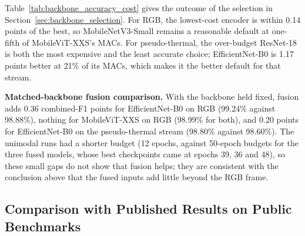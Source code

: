\begin{table}[H]
\centering
\caption[Accuracy vs.\ cost of visual backbones]{Combined F1 (\%) vs.\ cost of the visual backbones (cost from Table~\ref{tab:backbone_candidates}). Fused: AdapFuse-v1 with that backbone. $^\dagger$Lower bound. -- = not trained.}
\label{tab:backbone_accuracy_cost}
\end{table}

Table~\ref{tab:backbone_accuracy_cost} gives the outcome of the selection in Section~\ref{sec:backbone_selection}. For RGB, the lowest-cost encoder is within 0.14 points of the best, so MobileNetV3-Small remains a reasonable default at one-fifth of MobileViT-XXS's MACs. For pseudo-thermal, the over-budget ResNet-18 is both the most expensive and the least accurate choice; EfficientNet-B0 is 1.17 points better at 21\% of its MACs, which makes it the better default for that stream.

\textbf{Matched-backbone fusion comparison.} With the backbone held fixed, fusion adds 0.36 combined-F1 points for EfficientNet-B0 on RGB (99.24\% against 98.88\%), nothing for MobileViT-XXS on RGB (98.99\% for both), and 0.20 points for EfficientNet-B0 on the pseudo-thermal stream (98.80\% against 98.60\%). The unimodal runs had a shorter budget (12 epochs, against 50-epoch budgets for the three fused models, whose best checkpoints came at epochs 39, 36 and 48), so these small gaps do not show that fusion helps; they are consistent with the conclusion above that the fused inputs add little beyond the RGB frame.

\subsection{Comparison with Published Results on Public Benchmarks}
\label{sec:public_benchmark_results}

